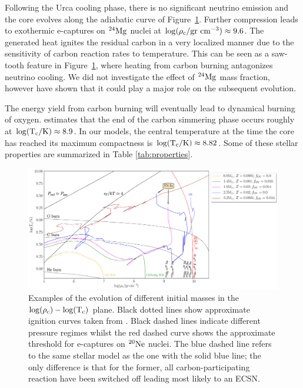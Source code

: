 \documentclass[../../main/thesis_msc.tex]{subfiles}
\begin{document}
        Following the Urca cooling phase, there is no significant neutrino emission and the core evolves along the adiabatic curve of Figure\, \ref{fig:RhoT}. Further compression leads to exothermic e-captures on $\rm ^{24}Mg$ nuclei at $\rm \log(\rho_c/gr \ cm^{-3}) \approx 9.6$. The generated heat ignites the residual carbon in a very localized manner due to the sensitivity of carbon reaction rates to temperature. This can be seen as a saw-tooth feature in Figure\, \ref{fig:RhoT}, where heating from carbon burning antagonizes neutrino cooling. We did not investigate the effect of $\rm ^{24}Mg$ mass fraction, however \cite{Gutierrez2005} have shown that it could play a major role on the subsequent evolution.
        
        The energy yield from carbon burning will eventually lead to dynamical burning of oxygen. \cite{Woosley2004} estimates that the end of the carbon simmering phase occurs roughly at $\rm \log(T_c/ \rm K) \approx 8.9$. In our models, the central temperature at the time the core has reached its maximum compactness is $\rm \log(T_c / \rm K) \approx 8.82$. Some of these stellar properties are summarized in Table \ref{tab:properties}.
        
        \begin{figure}[ht!]
            \centering
            \includegraphics[width=\textwidth]{../figures/chapter4/RhoT.pdf}
            \caption{Examples of the evolution of different initial masses in the $\rm \log(\rho_{\rm c})-\log(T_{\rm c})$ plane. Black dotted lines show approximate ignition curves taken from \mesa. Black dashed lines indicate different pressure regimes whilst the red dashed curve shows the approximate threshold for e-captures on $\rm ^{20}Ne$ nuclei. The blue dashed line refers to the same stellar model as the one with the solid blue line; the only difference is that for the former, all carbon-participating reaction have been switched off leading most likely to an ECSN.}
            \label{fig:RhoT}
        \end{figure}
        
\end{document}
